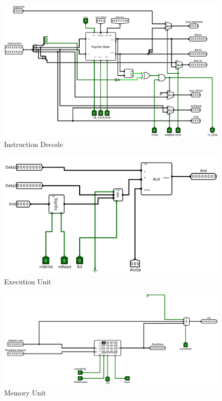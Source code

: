 \documentclass[12pt]{article}
\begin{document}
 \begin{figure}[H]
     \centering
     \includegraphics[width=\textwidth]{Images/Instruction Decode.png}
     \caption{Instruction Decode}
     \label{fig:id}
 \end{figure}


 \begin{figure}[H]
     \centering
     \includegraphics[width=\textwidth]{Images/Execution.png}
     \caption{Execution Unit}
     \label{fig:exec}
 \end{figure}

 \begin{figure}[H]
     \centering
     \includegraphics[width=\textwidth]{Images/Memory.png}
     \caption{Memory Unit}
     \label{fig:mem}
 \end{figure}
\end{document}
